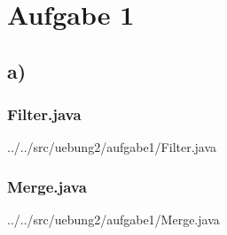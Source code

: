 \section*{Aufgabe 1}
\subsection*{a)}
\subsubsection*{Filter.java}

%

{../../src/uebung2/aufgabe1/Filter.java}


\subsubsection*{Merge.java}

{../../src/uebung2/aufgabe1/Merge.java}

